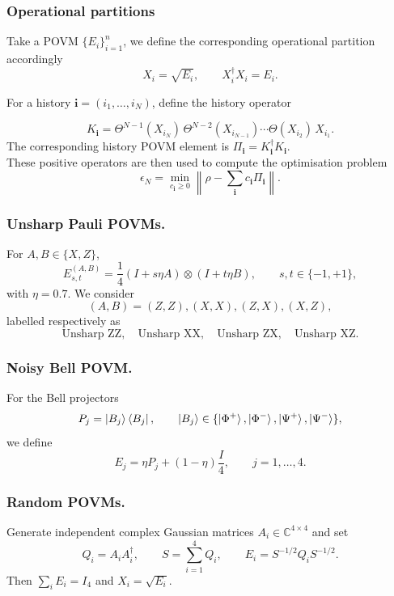 \documentclass{article}
\begin{document}
\subsubsection{Operational partitions}
Take a POVM $\{E_i\}_{i=1}^n$, we define the corresponding operational partition accordingly
\[
X_i=\sqrt{E_i},
\qquad
X_i^\dagger X_i=E_i.
\]


For a history $\mathbf i=(i_1,\ldots,i_N)$, define the history operator

$$
K_{\mathbf i}=\Theta^{N-1}(X_{i_N})\,
\Theta^{N-2}(X_{i_{N-1}})
\cdots
\Theta(X_{i_2})\,
X_{i_1}.
$$
The corresponding history POVM element is $\Pi_{\mathbf i}=K_{\mathbf i}^\dagger K_{\mathbf i}.$\\
These positive operators are then used to compute the optimisation problem
\begin{equation}
\epsilon_N=\min_{c_{\mathbf i}\geq0}
\left\|\rho-\sum_{\mathbf i}c_{\mathbf i}\Pi_{\mathbf i}
\right\|.    
\end{equation}


\subsubsection{Unsharp Pauli POVMs.}
For $A,B\in\{X,Z\}$,
\begin{equation}
E_{s,t}^{(A,B)}
=
\frac14
(I+s\eta A)\otimes(I+t\eta B),
\qquad s,t\in\{-1,+1\},
\end{equation}
with $\eta=0.7$. We consider
\[
(A,B)=(Z,Z),(X,X),(Z,X),(X,Z),
\]
labelled respectively as
\[
\text{Unsharp ZZ},\quad
\text{Unsharp XX},\quad
\text{Unsharp ZX},\quad
\text{Unsharp XZ}.
\]

\subsubsection{Noisy Bell POVM.}
For the Bell projectors
\[
P_j=\ket{B_j}\bra{B_j},
\qquad
\ket{B_j}\in
\{\ket{\Phi^+},\ket{\Phi^-},\ket{\Psi^+},\ket{\Psi^-}\},
\]
we define
\begin{equation}
E_j=\eta P_j+(1-\eta)\frac{I}{4},
\qquad j=1,\ldots,4.
\end{equation}

\subsubsection{Random POVMs.}
Generate independent complex Gaussian matrices $A_i\in\mathbb C^{4\times4}$ and set
\begin{equation}
Q_i=A_iA_i^\dagger,\qquad
S=\sum_{i=1}^4Q_i,\qquad
E_i=S^{-1/2}Q_iS^{-1/2}.
\end{equation}
Then $\sum_iE_i=I_4$ and $X_i=\sqrt{E_i}$.
\end{document}

